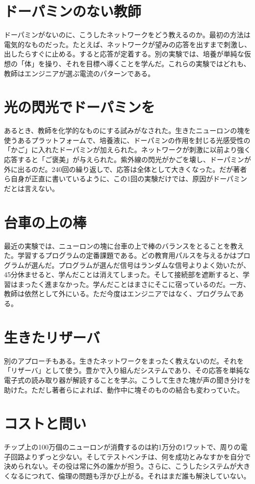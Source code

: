 \section*{ドーパミンのない教師}

ドーパミンがないのに、こうしたネットワークをどう教えるのか。最初の方法は電気的なものだった。たとえば、ネットワークが望みの応答を出すまで刺激し、出したらすぐに止める。すると応答が定着する。別の実験では、培養が単純な仮想の「体」を操り、それを目標へ導くことを学んだ。これらの実験ではどれも、教師はエンジニアが選ぶ電流のパターンである。

\section*{光の閃光でドーパミンを}

あるとき、教師を化学的なものにする試みがなされた。生きたニューロンの塊を使うあるプラットフォームで、培養液に、ドーパミンの作用を封じる光感受性の「かご」に入れたドーパミンが加えられた。ネットワークが刺激に以前より強く応答すると「ご褒美」が与えられた。紫外線の閃光がかごを壊し、ドーパミンが外に出るのだ。240回の繰り返しで、応答は全体として大きくなった。だが著者ら自身が正直に書いているように、この1回の実験だけでは、原因がドーパミンだとは言えない。

\section*{台車の上の棒}

最近の実験では、ニューロンの塊に台車の上で棒のバランスをとることを教えた。学習するプログラムの定番課題である。どの教育用パルスを与えるかはプログラムが選んだ。プログラムが選んだ信号はランダムな信号よりよく効いたが、45分休ませると、学んだことは消えてしまった。そして接続部を遮断すると、学習はまったく進まなかった。学んだことはまさにそこに宿っているのだ。一方、教師は依然として外にいる。ただ今度はエンジニアではなく、プログラムである。

\section*{生きたリザーバ}

別のアプローチもある。生きたネットワークをまったく教えないのだ。それを「リザーバ」として使う。豊かで入り組んだシステムであり、その応答を単純な電子式の読み取り器が解読することを学ぶ。こうして生きた塊が声の聞き分けを助けた。ただし著者らによれば、動作中に塊そのものの結合も変わっていた。

\section*{コストと問い}

チップ上の100万個のニューロンが消費するのは約1万分の1ワットで、周りの電子回路よりずっと少ない。そしてテストベンチは、何を成功とみなすかを自分で決められない。その役は常に外の誰かが担う。さらに、こうしたシステムが大きくなるにつれて、倫理の問題も浮かび上がる。それはまだ誰も解決していない。

